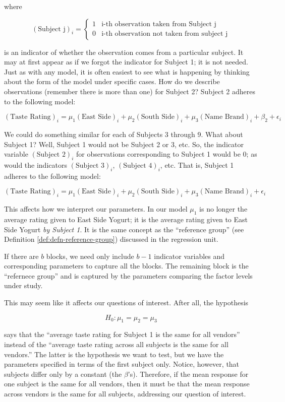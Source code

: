 \documentclass[
]{book}
\theoremstyle{plain}
\theoremstyle{mydefn}
\theoremstyle{myexmpl}
\theoremstyle{remark}
\begin{document}
where

\[(\text{Subject j})_i = \begin{cases}
  1 & \text{i-th observation taken from Subject j} \\
  0 & \text{i-th observation not taken from subject j}
  \end{cases}\]

is an indicator of whether the observation comes from a particular subject. It may at first appear as if we forgot the indicator for Subject 1; it is not needed. Just as with any model, it is often easiest to see what is happening by thinking about the form of the model under specific cases. How do we describe observations (remember there is more than one) for Subject 2? Subject 2 adheres to the following model:

\[(\text{Taste Rating})_i = \mu_1 (\text{East Side})_i + \mu_2 (\text{South Side})_i + \mu_3 (\text{Name Brand})_i + \beta_2 + \epsilon_i\]

We could do something similar for each of Subjects 3 through 9. What about Subject 1? Well, Subject 1 would not be Subject 2 or 3, etc. So, the indicator variable \((\text{Subject 2})_i\) for observations corresponding to Subject 1 would be 0; as would the indicators \((\text{Subject 3})_i\), \((\text{Subject 4})_i\), etc. That is, Subject 1 adheres to the following model:

\[(\text{Taste Rating})_i = \mu_1 (\text{East Side})_i + \mu_2 (\text{South Side})_i + \mu_3 (\text{Name Brand})_i + \epsilon_i\]

This affects how we interpret our parameters. In our model \(\mu_1\) is no longer the average rating given to East Side Yogurt; it is the average rating given to East Side Yogurt \emph{by Subject 1}. It is the same concept as the ``reference group'' (see Definition \ref{def:defn-reference-group}) discussed in the regression unit.

\begin{rmdtip}
If there are \(b\) blocks, we need only include \(b-1\) indicator variables and corresponding parameters to capture all the blocks. The remaining block is the ``refernece group'' and is captured by the parameters comparing the factor levels under study.
\end{rmdtip}

This may seem like it affects our questions of interest. After all, the hypothesis

\[H_0: \mu_1 = \mu_2 = \mu_3\]

says that the ``average taste rating for Subject 1 is the same for all vendors'' instead of the ``average taste rating across all subjects is the same for all vendors.'' The latter is the hypothesis we want to test, but we have the parameters specified in terms of the first subject only. Notice, however, that subjects differ only by a constant (the \(\beta\)'s). Therefore, if the mean response for one subject is the same for all vendors, then it must be that the mean response across vendors is the same for all subjects, addressing our question of interest.
\end{document}
